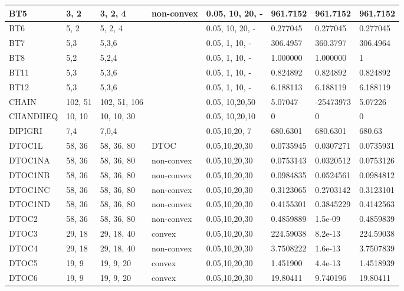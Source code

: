 \begin{landscape}
\begin{longtable}{l | l |  l  |  >{\footnotesize}p{3cm} | l | l | l | l  }
BT5   &  3, 2   & 3, 2, 4  & non-convex& 0.05, 10, 20, -  & 961.7152  &  961.7152  & 961.7152    \\ \hline
BT6  & 5, 2  & 5, 2, 4  &  & 0.05, 10, 20, -  & 0.277045  & 0.277045  & 0.277045   \\ \hline
BT7  & 5,3   & 5,3,6   & & 0.05, 1, 10, -   & 306.4957 & 360.3797  & 306.4964  \\ \hline
BT8  & 5,2   & 5,2,4   & & 0.05, 1, 10, -  & 1.000000  & 1.000000  & 1   \\ \hline
BT11 & 5,3  & 5,3,6  & & 0.05, 1, 10, -  &  0.824892 &  0.824892 & 0.824892   \\ \hline
BT12  &   5,3  & 5,3,6 &&  0.05, 1, 10, - & 6.188113 &  6.188119 & 6.188119   \\ \hline
CHAIN & 102, 51 & 102, 51, 106 & &     0.05, 10,20,50 & 5.07047 & -25473973 & 5.07226  \\ \hline
CHANDHEQ & 10, 10 &  10, 10, 30 & &  0.05, 10,20,10 & 0  & 0  & 0   \\ \hline
DIPIGRI & 7,4 & 7,0,4  & & 0.05,10,20, 7  &  680.6301 &  680.6301 & 680.63   \\ \hline
DTOC1L & 58, 36 & 58, 36, 80 & DTOC & 0.05,10,20,30 &0.0735945   &0.0307271  & 0.0735931 \\ \hline
DTOC1NA & 58, 36 & 58, 36, 80 &non-convex  & 0.05,10,20,30&  0.0753143   &0.0320512  & 0.0753126 \\ \hline
DTOC1NB & 58, 36 & 58, 36, 80 &non-convex   & 0.05,10,20,30 &0.0984835   &0.0524561  & 0.0984812 \\ \hline
DTOC1NC & 58, 36 & 58, 36, 80 & non-convex  & 0.05,10,20,30 &0.3123065    & 0.2703142   &  0.3123101 \\ \hline
DTOC1ND & 58, 36 & 58, 36, 80 & non-convex  & 0.05,10,20,30& 0.4155301   &  0.3845229   &  0.4142563 \\ \hline
DTOC2 & 58, 36 & 58, 36, 80 & non-convex  & 0.05,10,20,30 &     0.4859889   &  1.5e-09  &  0.4859839 \\ \hline
DTOC3 & 29, 18 &  29, 18, 40 & convex  & 0.05,10,20,30      &     224.59038   &  8.2e-13  &  224.59038 \\ \hline
DTOC4 & 29, 18 &  29, 18, 40 &non-convex  & 0.05,10,20,30&      3.7508222  &   1.6e-13  &  3.7507839 \\ \hline
DTOC5 & 19, 9 &  19, 9, 20 &convex  & 0.05,10,20,30 &  1.451900  &   4.4e-13  & 1.4518939 \\ \hline
DTOC6 & 19, 9 &  19, 9, 20 &convex  &  0.05,10,20,30 & 19.80411 &  9.740196 & 19.80411 \\ \hline

\end{longtable}
\end{landscape}
